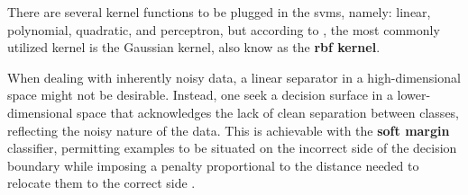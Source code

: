 


There are several kernel functions to be plugged in the \gls{svm}s, namely: linear, polynomial, quadratic, and perceptron, but according to \textcite{Goodfellow2016}, the most commonly utilized kernel is the Gaussian kernel, also know as the \textbf{\gls{rbf} kernel}.%



When dealing with inherently noisy data, a linear separator in a high-dimensional space might not be desirable. Instead, one seek a decision surface in a lower-dimensional space that acknowledges the lack of clean separation between classes, reflecting the noisy nature of the data. This is achievable with the \textbf{soft margin} classifier, permitting examples to be situated on the incorrect side of the decision boundary while imposing a penalty proportional to the distance needed to relocate them to the correct side \cite{Russel2010}.%

